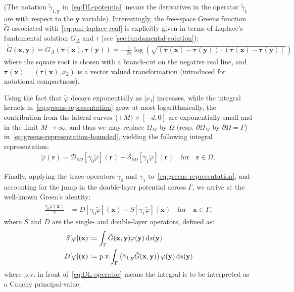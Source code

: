 \documentclass[11pt]{article}
\newcommand{\bx}{\mathbf{x}}
\newcommand{\btau}{\boldsymbol{\tau}}
\newcommand{\by}{\mathbf{y}}
\newcommand{\br}{\boldsymbol{r}}
\newcommand{\de}{\,\mathrm{d}}
\newcommand{\tvarphi}{\tilde \varphi}
\begin{document}
(The notation $\tilde{\gamma}_{1,\by}$ in~\eqref{eq:DL-potential} means the
derivatives in the operator $\tilde{\gamma}_1$ are with respect to the $\by$
variable). Interestingly, the free-space Greens function $\tilde{G}$ associated
with~\cref{eq:pml-laplace-real} is explicitly given in terms of Laplace's
fundamental solution $G_\Delta$ and $\tau$ (see \cref{sec:fundamental-solution}):
\begin{align}
  \label{eq:complex-Green-function}
\tilde{G}(\bx,\by) = G_{\Delta}(\btau(\bx),\btau(\by)) = -\frac{1}{2\pi}\log \left( \sqrt{(\btau(\bx)-\btau(\by))\cdot(\btau(\bx)-\boldsymbol{\tau}(\by))} \right) 
\end{align}
where the square root is chosen with a branch-cut on the negative real line, and
$\btau(\bx) = (\tau(\bx),x_2)$ is a vector valued transformation (introduced for
notational compactness). 

Using the fact that $\tvarphi$ decays exponentially as $|x_1|$ increases, while
the integral kernels in~\cref{eq:greens-representation} grow at most
logarithmically, the contribution from the lateral curves $\{ \pm M\} \times
[-d,0]$ are exponentially small and in the limit $M \to \infty$, and thus we may
replace $\Omega_M$ by $\Omega$ (resp. $\partial \Omega_M$ by $\partial \Omega =
\Gamma$) in~\cref{eq:greens-representation-bounded}, yielding the following
integral representation:
\begin{align}
  \label{eq:greens-representation}
  \tvarphi(\br) =\mathcal{D}_{\partial \Omega}[\gamma_0\tvarphi](\br) - \mathcal{S}_{\partial \Omega}[\tilde{\gamma}_1 {\tvarphi}](\br)\quad \mbox{for} \quad \br \in \Omega,
\end{align}

Finally, applying the trace operators $\gamma_0$ and $\gamma_1$
to~\cref{eq:greens-representation}, and accounting for the jump in the
double-layer potential across $\Gamma$, we arrive at the well-known Green's
identity:
\begin{align}
  \label{eq:greens-formula}
  \frac{\gamma_0 \tvarphi(\bx)}{2} &=  D[\gamma_0 \tvarphi](\bx) - S[{\gamma}_1 \tvarphi](\bx) \quad \mbox{for} \quad \bx \in \Gamma,
\end{align}
where $S$ and $D$ are the single- and double-layer operators,
defined as:
\begin{subequations}
  \label{eq:calderon-operators}
  \begin{align}
  \label{eq:SL-operator}  
  S[\varphi](\bx) &:= \int_\Gamma \tilde{G}(\bx,\by) \varphi(\by) \de s(\by)\\
  \label{eq:DL-operator}  
  D[\varphi](\bx) &:= {\rm p.v.}\! \int_\Gamma\left(\tilde{\gamma}_{1,\by}\tilde{G}(\bx,\by)\right)
  \varphi(\by) \de s(\by)
\end{align}\label{eq:BIOS}\end{subequations}
where p.v. in front of~\cref{eq:DL-operator} means the integral is to be
interpreted as a Cauchy principal-value.
\end{document}
